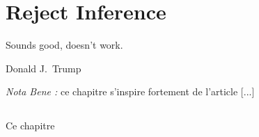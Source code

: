 \chapter{Reject Inference} \label{chap2}

\epigraph{Sounds good, doesn't work.}{Donald J.\ Trump}


\textit{Nota Bene :} ce chapitre s'inspire fortement de l'article [...]



\section{}



\bigskip

Ce chapitre

\printbibliography[heading=subbibliography, title=Références du chapitre 2]